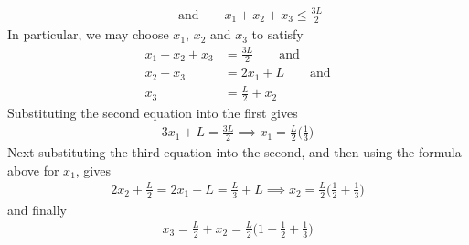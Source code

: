 \begin{itemize}
\begin{align*}
\qquad\text{and}\qquad x_1+ x_2+x_3\le \frac{3L}{2}
\end{align*}
In particular, we may choose $x_1$, $x_2$ and $x_3$ to satisfy
\begin{align*}
x_1+ x_2+x_3&= \frac{3L}{2}\qquad\text{and} \\
x_2+x_3&= 2x_1 + L \qquad\text{and} \\
x_3 &= \frac{L}{2} + x_2
\end{align*}
Substituting the second equation into the first gives
\begin{align*}
3x_1 +L = \frac{3L}{2}
\implies x_1 = \frac{L}{2}\Big(\frac{1}{3}\Big)
\end{align*}
Next substituting the third equation into the second, and then
using the formula above for $x_1$, gives
\begin{align*}
2x_2 +\frac{L}{2} = 2x_1+L = \frac{L}{3} + L
\implies x_2 = \frac{L}{2}\Big(\frac{1}{2}+\frac{1}{3}\Big)
\end{align*}
and finally
\begin{align*}
     x_3 = \frac{L}{2} + x_2
         = \frac{L}{2}\Big(1+\frac{1}{2}+\frac{1}{3}\Big)
\end{align*}



\end{itemize}
